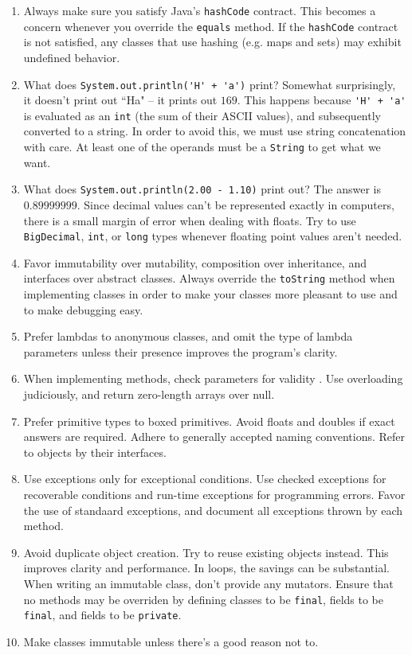 \begin{enumerate}
    \item Always make sure you satisfy Java's \verb!hashCode! contract. This becomes a concern whenever you override the \verb!equals! method. If the \verb!hashCode! contract is not satisfied, any classes that use hashing (e.g. maps and sets) may exhibit undefined behavior. 
    \item What does \verb!System.out.println('H' + 'a')! print? Somewhat surprisingly, it doesn't print out ``Ha" -- it prints out $169$. This happens because \verb!'H' + 'a' ! is evaluated as an \verb!int! (the sum of their ASCII values), and subsequently converted to a string. In order to avoid this, we must use string concatenation with care. At least one of the operands must be a \verb!String! to get what we want. 
    \item What does \verb!System.out.println(2.00 - 1.10)! print out? The answer is $0.89999999$. Since decimal values can't be represented exactly in computers, there is a small margin of error when dealing with floats. Try to use \verb!BigDecimal!, \verb!int!, or \verb!long! types whenever floating point values aren't needed.
    \item Favor immutability over mutability, composition over inheritance, and interfaces over abstract classes. Always override the \verb!toString! method when implementing classes in order to make your classes more pleasant to use and to make debugging easy.
    \item Prefer lambdas to anonymous classes, and omit the type of lambda parameters unless their presence improves the program's clarity.
    \item When implementing methods, check parameters for validity . Use overloading judiciously, and return zero-length arrays over null. 
    \item Prefer primitive types to boxed primitives. Avoid floats and doubles if exact answers are required. Adhere to generally accepted naming conventions. Refer to objects by their interfaces.
    \item Use exceptions only for exceptional conditions. Use checked exceptions for recoverable conditions and run-time exceptions for programming errors. Favor the use of standaard exceptions, and document all exceptions thrown by each method.
    \item Avoid duplicate object creation. Try to reuse existing objects instead. This improves clarity and performance. In loops, the savings can be substantial. When writing an immutable class, don't provide any mutators. Ensure that no methods may be overriden by defining classes to be \verb!final!, fields to be \verb!final!, and fields to be \verb!private!.
    \item Make classes immutable unless there's a good reason not to.
\end{enumerate}